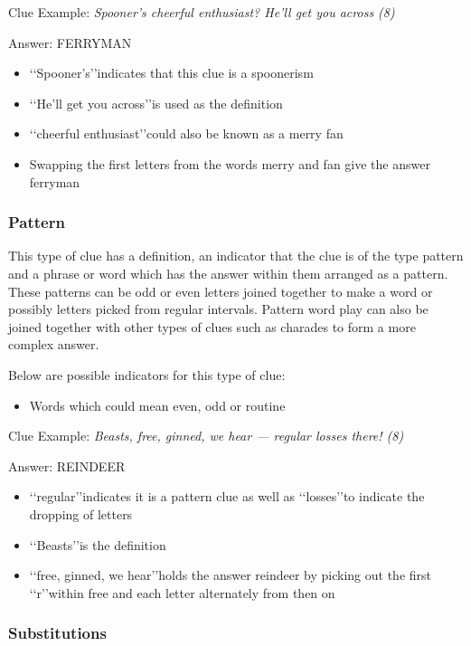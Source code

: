 Clue Example: \emph{Spooner's cheerful enthusiast? He'll get you across (8)} 

Answer: FERRYMAN 

\begin{itemize}
	\item \lq\lq Spooner’s\rq\rq indicates that this clue is a spoonerism 
	\item \lq\lq He’ll get you across\rq\rq is used as the definition 
	\item \lq\lq cheerful enthusiast\rq\rq could also be known as a merry fan 
	\item Swapping the first letters from the words merry and fan give the answer ferryman 
\end{itemize}

\subsubsection{Pattern}

This type of clue has a definition, an indicator that the clue is of the type pattern and a phrase or word which has the answer within them arranged as a pattern. These patterns can be odd or even letters joined together to make a word or possibly letters picked from regular intervals. Pattern word play can also be joined together with other types of clues such as charades to form a more complex answer. 

Below are possible indicators for this type of clue:
\begin{itemize} 
	\item Words which could mean even, odd or routine 
\\
\end{itemize}

Clue Example: \emph{Beasts, free, ginned, we hear — regular losses there! (8)} 

Answer: REINDEER 

\begin{itemize}
	\item \lq\lq regular\rq\rq indicates it is a pattern clue as well as \lq\lq losses\rq\rq to indicate the dropping of letters 
	\item \lq\lq Beasts\rq\rq is the definition 
	\item \lq\lq free, ginned, we hear\rq\rq holds the answer reindeer by picking out the first \lq\lq r\rq\rq within free and each letter alternately from then on
\end{itemize} 

\subsubsection{Substitutions}

